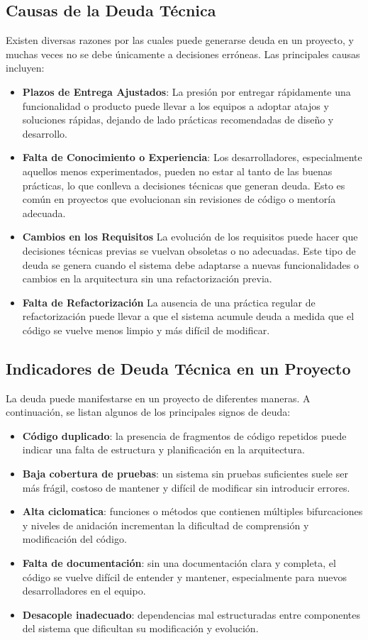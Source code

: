 \subsection{Causas de la Deuda Técnica}
Existen diversas razones por las cuales puede generarse \gls{deuda} en un proyecto, y muchas veces no se debe únicamente a decisiones erróneas. Las principales causas incluyen:
\begin{itemize}
    \item \textbf{Plazos de Entrega Ajustados}: La presión por entregar rápidamente una funcionalidad o producto puede llevar a los equipos a adoptar atajos y soluciones rápidas, dejando de lado prácticas recomendadas de diseño y desarrollo.
    \item \textbf{Falta de Conocimiento o Experiencia}: Los desarrolladores, especialmente aquellos menos experimentados, pueden no estar al tanto de las buenas prácticas, lo que conlleva a decisiones técnicas que generan deuda. Esto es común en proyectos que evolucionan sin revisiones de código o mentoría adecuada.
    \item \textbf{Cambios en los Requisitos} La evolución de los requisitos puede hacer que decisiones técnicas previas se vuelvan obsoletas o no adecuadas. Este tipo de deuda se genera cuando el sistema debe adaptarse a nuevas funcionalidades o cambios en la arquitectura sin una refactorización previa.
    \item \textbf{Falta de Refactorización} La ausencia de una práctica regular de refactorización puede llevar a que el sistema acumule \gls{deuda} a medida que el código se vuelve menos limpio y más difícil de modificar.
\end{itemize}

\subsection{Indicadores de Deuda Técnica en un Proyecto}
La \gls{deuda} puede manifestarse en un proyecto de diferentes maneras. A continuación, se listan algunos de los principales signos de \gls{deuda}:

\begin{itemize}
    \item \textbf{Código duplicado}: la presencia de fragmentos de código repetidos puede indicar una falta de estructura y planificación en la arquitectura.
    \item \textbf{Baja cobertura de pruebas}: un sistema sin pruebas suficientes suele ser más frágil, costoso de mantener y difícil de modificar sin introducir errores.
    \item \textbf{Alta \gls{ciclomatica}}: funciones o métodos que contienen múltiples bifurcaciones y niveles de anidación incrementan la dificultad de comprensión y modificación del código.
    \item \textbf{Falta de documentación}: sin una documentación clara y completa, el código se vuelve difícil de entender y mantener, especialmente para nuevos desarrolladores en el equipo.
    \item \textbf{Desacople inadecuado}: dependencias mal estructuradas entre componentes del sistema que dificultan su modificación y evolución.
\end{itemize}

